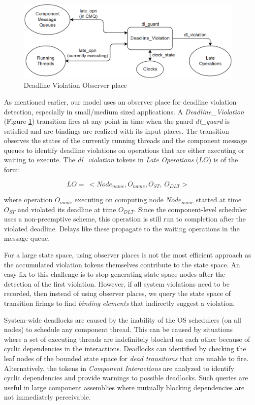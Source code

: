 \begin{figure}[htb]
	\centering
	\includegraphics[width=\textwidth]{./img/Deadline_Violations.png}
	\caption{Deadline Violation Observer place}
	\label{fig:DL}
\end{figure}

As mentioned earlier, our model uses an observer place for deadline violation detection, especially in small/medium sized applications. A \emph{Deadline\_Violation} (Figure \ref{fig:DL}) transition fires at any point in time when the guard \emph{dl\_guard} is satisfied and arc bindings are realized with its input places. The transition observes the states of the currently running threads and the component message queues to identify deadline violations on operations that are either executing or waiting to execute. The \emph{dl\_violation} tokens in \emph{Late Operations} ($LO$) is of the form:

\begin{equation}
\label{eq:DLV}
LO = \ <Node_{name}, O_{name}, O_{ST}, \ O_{DLT}>
\end{equation}

where operation $O_{name}$ executing on computing node $Node_{name}$ started at time $O_{ST}$ and violated its deadline at time $O_{DLT}$. Since the component-level scheduler uses a non-preemptive scheme, this operation is still run to completion after the violated deadline. Delays like these propagate to the waiting operations in the message queue.

For a large state space, using observer places is not the most efficient approach as the accumulated violation tokens themselves contribute to the state space. An easy fix to this challenge is to stop generating state space nodes after the detection of the first violation. However, if all system violations need to be recorded, then instead of using observer places, we query the state space of transition firings to find \emph{binding elements} that indirectly suggest a violation.

System-wide deadlocks are caused by the inability of the OS schedulers (on all nodes) to schedule any component thread. This can be caused by situations where a set of executing threads are indefinitely blocked on each other because of cyclic dependencies in the interactions. Deadlocks can identified by checking the leaf nodes of the bounded state space for \emph{dead transitions} that are unable to fire. Alternatively, the tokens in \emph{Component Interactions} are analyzed to identify cyclic dependencies and provide warnings to possible deadlocks. Such queries are useful in large component assemblies where mutually blocking dependencies are not immediately perceivable. 

